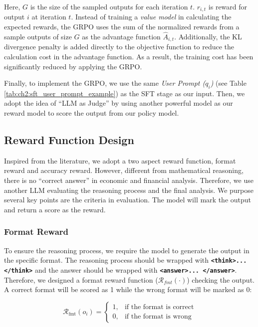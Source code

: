 Here, $G$ is the size of the sampled outputs for each iteration $t$. $r_{i,t}$ is reward for output $i$ at iteration $t$. Instead of training a \textit{value model} in calculating the expected rewards, the GRPO uses the sum of the normalized rewards from a sample outputs of size $G$ as the advantage function $\hat{A}_{i,t}$. Additionally, the KL divergence penalty is added directly to the objective function to reduce the calculation cost in the advantage function. As a result, the training cost has been significantly reduced by applying the GRPO. 

Finally, to implement the GRPO, we use the same \textit{User Prompt ($q_i$)} (see Table \ref{tab:ch2:sft_user_prompt_example}) as the SFT stage as our input. Then, we adopt the idea of ``LLM as Judge'' by using another powerful model as our reward model to score the output from our policy model.



\subsection{Reward Function Design}
Inspired from the literature, we adopt a two aspect reward function, format reward and accuracy reward. However, different from mathematical reasoning, there is no ``correct answer'' in economic and financial analysis. Therefore, we use another LLM evaluating the reasoning process and the final analysis. We purpose several key points are the criteria in evaluation. The model will mark the output and return a score as the reward.

\subsubsection{Format Reward}
To ensure the reasoning process, we require the model to generate the output in the specific format. The reasoning process should be wrapped with \textbf{\texttt{\textless think\textgreater ... \textless /think\textgreater}} and the answer should be wrapped with \textbf{\texttt{\textless answer\textgreater ... \textless /answer\textgreater}}. Therefore, we designed a format reward function ($\mathcal{R}_{fmt}(\cdot)$) checking the output. A correct format will be scored as 1 while the wrong format will be marked as 0:


\begin{equation*}
    \mathcal{R}_{\text{fmt}}(o_i) = 
    \begin{cases}
        1, & \text{if the format is correct} \\
        0, & \text{if the format is wrong}
    \end{cases}
\end{equation*}




